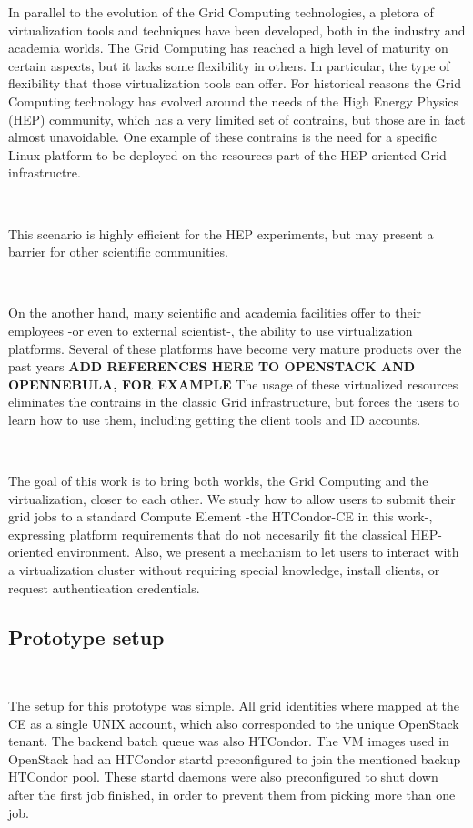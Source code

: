 \documentclass[a4paper]{jpconf}
\begin{document}
In parallel to the evolution of the Grid Computing technologies, a pletora of virtualization tools and techniques have been developed,
both in the industry and academia worlds.
The Grid Computing has reached a high level of maturity on certain aspects, but it lacks some flexibility in others.
In particular, the type of flexibility that those virtualization tools can offer. 
For historical reasons the Grid Computing technology has evolved around the needs of the High Energy Physics (HEP) community, 
which has a very limited set of contrains, but those are in fact almost unavoidable. 
One example of these contrains is the need for a specific Linux platform to be deployed on the resources part of the HEP-oriented Grid infrastructre.

~

This scenario is highly efficient for the HEP experiments, 
but may present a barrier for other scientific communities.

~

On the another hand, many scientific and academia facilities offer to their employees -or even to external scientist-,
the ability to use virtualization platforms. 
Several of these platforms have become very mature products over the past years \textbf{ADD REFERENCES HERE TO OPENSTACK AND OPENNEBULA, FOR EXAMPLE} \newline
The usage of these virtualized resources eliminates the contrains in the classic Grid infrastructure, 
but forces the users to learn how to use them, including getting the client tools and ID accounts. 

~

The goal of this work is to bring both worlds, the Grid Computing and the virtualization, closer to each other. 
We study how to allow users to submit their grid jobs to a standard Compute Element -the HTCondor-CE in this work-,
expressing platform requirements that do not necesarily fit the classical HEP-oriented environment.
Also, we present a mechanism to let users to interact with a virtualization cluster without requiring
special knowledge, install clients, or request authentication credentials. 

\subsection{Prototype setup}

~

The setup for this prototype was simple. 
All grid identities where mapped at the CE as a single UNIX account, which also corresponded to the unique OpenStack tenant. 
The backend batch queue was also HTCondor.
The VM images used in OpenStack had an HTCondor startd preconfigured to join the mentioned backup HTCondor pool. 
These startd daemons were also preconfigured to shut down after the first job finished, in order to prevent them from picking more than one job. 
\end{document}
